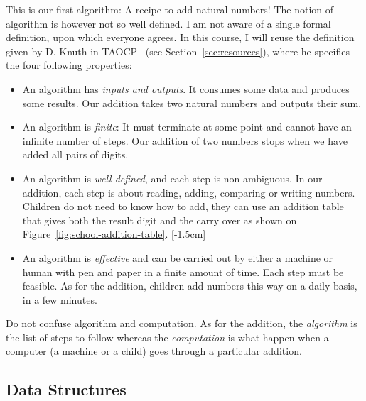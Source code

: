 \documentclass{aldast}
\begin{document}
This is our first algorithm: A recipe to add natural numbers! The
notion of algorithm is however not so well defined. I am not aware of
a single formal definition, upon which everyone agrees. In this course,
I will reuse the definition given by D. Knuth in
TAOCP~\cite[p. 5--6]{knuth1978} (see Section~\ref{sec:resources}),
where he specifies the four following properties:
\begin{itemize}
\item An algorithm has \emph{inputs and outputs}. It consumes some data
  and produces some results. Our addition takes two natural numbers
  and outputs their sum.
\item An algorithm is \emph{finite}: It must terminate at some point
  and cannot have an infinite number of steps. Our addition of two
  numbers stops when we have added all pairs of digits.
\item An algorithm is \emph{well-defined}, and each step is
  non-ambiguous. In our addition, each step is about reading, adding,
  comparing or writing numbers. Children do not need to know how to
  add, they can use an addition table that gives both the result digit
  and the carry over as shown on Figure~\ref{fig:school-addition-table}.
  [-1.5cm]
  
\item An algorithm is \emph{effective} and can be carried out by
  either a machine or human with pen and paper in a finite amount of
  time. Each step must be feasible. As for the addition, children add
  numbers this way on a daily basis, in a few minutes.
\end{itemize}

Do not confuse algorithm and computation. As for the addition, the
\emph{algorithm} is the list of steps to follow whereas the
\emph{computation} is what happen when a computer (a machine or a
child) goes through a particular addition.

\subsection{Data Structures}
\end{document}
